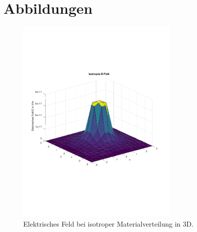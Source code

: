 \documentclass[Protokollheft.tex]{subfiles}
\begin{document}
\section{Abbildungen}
\begin{figure}[h!]
	\centering
	\includegraphics[trim = 10mm 60mm 10mm 50mm, clip, width=0.7\textwidth]{efield_1.pdf}
	\caption{Elektrisches Feld bei isotroper Materialverteilung in 3D.}
	\label{Abb:61}
\end{figure}
\end{document}
